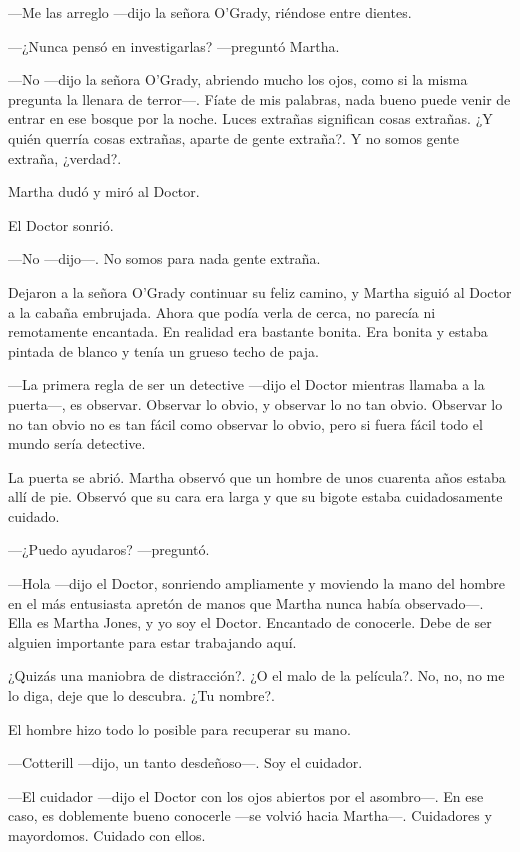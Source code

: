 ---Me las arreglo ---dijo la señora O'Grady, riéndose entre dientes.

---¿Nunca pensó en investigarlas? ---preguntó Martha.

---No ---dijo la señora O'Grady, abriendo mucho los ojos, como si la misma pregunta la llenara de terror---. Fíate de mis palabras, nada bueno puede venir de entrar en ese bosque por la noche. Luces extrañas significan cosas extrañas. ¿Y quién querría cosas extrañas, aparte de gente extraña?. Y no somos gente extraña, ¿verdad?.

Martha dudó y miró al Doctor.

El Doctor sonrió.

---No ---dijo---. No somos para nada gente extraña.

Dejaron a la señora O'Grady continuar su feliz camino, y Martha siguió al Doctor a la cabaña embrujada. Ahora que podía verla de cerca, no parecía ni remotamente encantada. En realidad era bastante bonita. Era bonita y estaba pintada de blanco y tenía un grueso techo de paja.

---La primera regla de ser un detective ---dijo el Doctor mientras llamaba a la puerta---, es observar. Observar lo obvio, y observar lo no tan obvio. Observar lo no tan obvio no es tan fácil como observar lo obvio, pero si fuera fácil todo el mundo sería detective.

La puerta se abrió. Martha observó que un hombre de unos cuarenta años estaba allí de pie. Observó que su cara era larga y que su bigote estaba cuidadosamente cuidado.

---¿Puedo ayudaros? ---preguntó.

---Hola ---dijo el Doctor, sonriendo ampliamente y moviendo la mano del hombre en el más entusiasta apretón de manos que Martha nunca había observado---. Ella es Martha Jones, y yo soy el Doctor. Encantado de conocerle. Debe de ser alguien importante para estar trabajando aquí.

¿Quizás una maniobra de distracción?. ¿O el malo de la película?. No, no, no me lo diga, deje que lo descubra. ¿Tu nombre?.

El hombre hizo todo lo posible para recuperar su mano.

---Cotterill ---dijo, un tanto desdeñoso---. Soy el cuidador.

---El cuidador ---dijo el Doctor con los ojos abiertos por el asombro---. En ese caso, es doblemente bueno conocerle ---se volvió hacia Martha---. Cuidadores y mayordomos. Cuidado con ellos.

